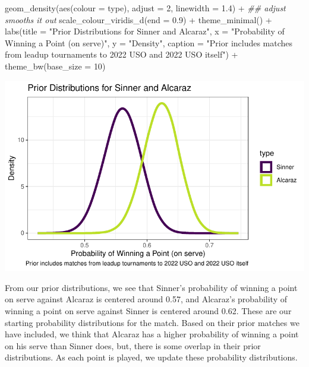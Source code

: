 \documentclass[
  letterpaper,
  DIV=11,
  numbers=noendperiod]{scrartcl}
\newenvironment{Shaded}{\begin{snugshade}}{\end{snugshade}}
\newcommand{\AttributeTok}[1]{\textcolor[rgb]{0.40,0.45,0.13}{#1}}
\newcommand{\DecValTok}[1]{\textcolor[rgb]{0.68,0.00,0.00}{#1}}
\newcommand{\DocumentationTok}[1]{\textcolor[rgb]{0.37,0.37,0.37}{\textit{#1}}}
\newcommand{\FloatTok}[1]{\textcolor[rgb]{0.68,0.00,0.00}{#1}}
\newcommand{\FunctionTok}[1]{\textcolor[rgb]{0.28,0.35,0.67}{#1}}
\newcommand{\NormalTok}[1]{\textcolor[rgb]{0.00,0.23,0.31}{#1}}
\newcommand{\SpecialCharTok}[1]{\textcolor[rgb]{0.37,0.37,0.37}{#1}}
\newcommand{\StringTok}[1]{\textcolor[rgb]{0.13,0.47,0.30}{#1}}
\begin{document}
\begin{Shaded}
\begin{Highlighting}[]
  \FunctionTok{geom\_density}\NormalTok{(}\FunctionTok{aes}\NormalTok{(}\AttributeTok{colour =}\NormalTok{ type), }\AttributeTok{adjust =} \DecValTok{2}\NormalTok{, }
               \AttributeTok{linewidth =} \FloatTok{1.4}\NormalTok{) }\SpecialCharTok{+} \DocumentationTok{\#\# adjust smooths it out}
  \FunctionTok{scale\_colour\_viridis\_d}\NormalTok{(}\AttributeTok{end =} \FloatTok{0.9}\NormalTok{) }\SpecialCharTok{+}
  \FunctionTok{theme\_minimal}\NormalTok{() }\SpecialCharTok{+}
  \FunctionTok{labs}\NormalTok{(}\AttributeTok{title =} \StringTok{"Prior Distributions for Sinner and Alcaraz"}\NormalTok{,}
       \AttributeTok{x =} \StringTok{"Probability of Winning a Point (on serve)"}\NormalTok{,}
       \AttributeTok{y =} \StringTok{"Density"}\NormalTok{,}
       \AttributeTok{caption =} \StringTok{"Prior includes matches from leadup tournaments to 2022 USO and 2022 USO itself"}\NormalTok{) }\SpecialCharTok{+}
  \FunctionTok{theme\_bw}\NormalTok{(}\AttributeTok{base\_size =} \DecValTok{10}\NormalTok{)}
\end{Highlighting}
\end{Shaded}

\includegraphics{Project_Write_Up_files/figure-pdf/unnamed-chunk-11-1.pdf}

\linespread{2}

From our prior distributions, we see that Sinner's probability of
winning a point on serve against Alcaraz is centered around 0.57, and
Alcaraz's probability of winning a point on serve against Sinner is
centered around 0.62. These are our starting probability distributions
for the match. Based on their prior matches we have included, we think
that Alcaraz has a higher probability of winning a point on his serve
than Sinner does, but, there is some overlap in their prior
distributions. As each point is played, we update these probability
distributions.
\end{document}
